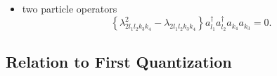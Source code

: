\documentclass[aps,preprint]{revtex4}%
\begin{document}
\begin{itemize}
\begin{align}
&  \lambda_{2l_{1}l_{2}l_{1}l_{4}}\lambda_{2l_{4}l_{3}l_{2}l_{3}}%
+\lambda_{2l_{1}l_{2}l_{2}l_{4}}\lambda_{2l_{4}l_{3}l_{1}l_{3}}+\lambda
_{2l_{1}l_{2}l_{3}l_{4}}\lambda_{2l_{4}l_{3}l_{1}l_{2}}+\nonumber\\
&  \lambda_{2l_{1}l_{3}l_{1}l_{4}}\lambda_{2l_{4}l_{2}l_{2}l_{3}}%
+\lambda_{2l_{1}l_{3}l_{2}l_{4}}\lambda_{2l_{4}l_{2}l_{1}l_{3}}+\lambda
_{2l_{1}l_{3}l_{3}l_{4}}\lambda_{2l_{4}l_{2}l_{1}l_{2}}+\nonumber\\
&  \lambda_{2l_{2}l_{3}l_{1}l_{4}}\lambda_{2l_{4}l_{1}l_{2}l_{3}}%
+\lambda_{2l_{2}l_{3}l_{2}l_{4}}\lambda_{2l_{4}l_{1}l_{1}l_{3}}+\lambda
_{2l_{2}l_{3}l_{3}l_{4}}\lambda_{2l_{4}l_{1}l_{1}l_{2}}\left.  =\right.  0
\end{align}
which gives for example
\begin{align}
&  \lambda_{2121l}\lambda_{2l323}+\lambda_{2122l}\lambda_{2l313}%
+\lambda_{2123l}\lambda_{2l312}+\nonumber\\
&  \lambda_{2131l}\lambda_{2l223}+\lambda_{2132l}\lambda_{2l213}%
+\lambda_{2133l}\lambda_{2l212}+\nonumber\\
&  \lambda_{2231l}\lambda_{2l123}+\lambda_{2232l}\lambda_{2l113}%
+\lambda_{2233l}\lambda_{2l112}\left.  =\right.  0
\end{align}


\item two particle operators%
\begin{equation}
\left\{  \lambda_{2l_{1}l_{2}k_{3}k_{4}}^{2}-\lambda_{2l_{1}l_{2}k_{3}k_{4}%
}\right\}  a_{l_{1}}^{\dagger}a_{l_{2}}^{\dagger}a_{k_{4}}a_{k_{3}}=0.
\end{equation}

\end{itemize}

\subsection{Relation to First Quantization}
\end{document}
